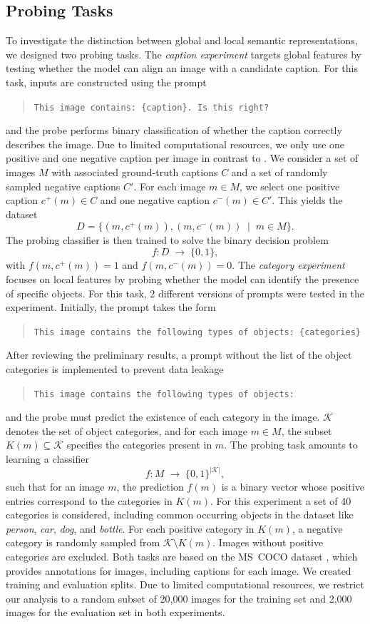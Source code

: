 \documentclass[11pt]{article}
\begin{document}
\subsection{Probing Tasks}
To investigate the distinction between global and local semantic representations,
we designed two probing tasks. The \emph{caption experiment} targets global features
by testing whether the model can align an image with a candidate caption.
For this task, inputs are constructed using the prompt
\begin{quote}
\texttt{This image contains: \{caption\}. Is this right?}
\end{quote}
and the probe performs binary classification of whether the caption correctly describes the image. Due to limited computational resources, we only use one positive and one negative caption per image in contrast to \cite{tao2024probingmultimodallargelanguage}.
We consider a set of images $M$ with associated ground-truth captions $C$
and a set of randomly sampled negative captions $C'$.
For each image $m \in M$, we select one positive caption $c^+(m) \in C$
and one negative caption $c^-(m) \in C'$.
This yields the dataset
\[
D = \{(m, c^+(m)), (m, c^-(m)) \;\mid\; m \in M\}.
\]
The probing classifier is then trained to solve the binary decision problem
\[
f : D \;\rightarrow\; \{0,1\},
\]
with $f(m, c^+(m)) = 1$ and $f(m, c^-(m)) = 0$.
The \emph{category experiment} focuses on local features by probing whether the model
can identify the presence of specific objects. For this task, 2 different versions of prompts were tested in the experiment.
Initially, the prompt takes the form
\begin{quote}
\texttt{This image contains the following types of objects: \{categories\}}
\end{quote}
After reviewing the preliminary results, a prompt without the list of the object categories is implemented to prevent data leakage
\begin{quote}
\texttt{This image contains the following types of objects: }
\end{quote}
and the probe must predict the existence of each category in the image. $\mathcal{K}$ denotes the set of object categories, and for each image $m \in M$,
the subset $K(m) \subseteq \mathcal{K}$ specifies the categories present in $m$.
The probing task amounts to learning a classifier
\[
f : M \;\rightarrow\; \{0,1\} ^{|\mathcal{K}|},
\]
such that for an image $m$, the prediction $f(m)$ is a binary vector whose positive entries correspond to the categories in $K(m)$.
For this experiment a set of 40 categories is considered, including common occurring objects in the dataset like \textit{person}, \textit{car}, \textit{dog}, and \textit{bottle}.
For each positive category in $K(m)$, a negative category is randomly sampled from $\mathcal{K} \setminus K(m)$. Images without positive categories are excluded.
Both tasks are based on the MS~COCO dataset \cite{lin2014microsoft}, which provides annotations
for images, including captions for each image. We created
training and evaluation splits. Due to limited computational resources, we restrict our analysis to a random subset of 20,000 images for the training set and 2,000 images for the evaluation set in both experiments.
\end{document}
